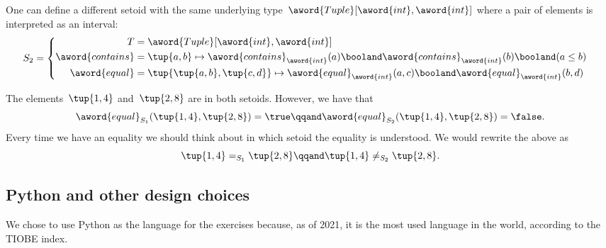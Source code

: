 One can define a different setoid with the same underlying type~$\aword{Tuple}[\aword{int}, \aword{int}]$ where a pair of elements is interpreted as an interval:
\begin{equation}
    S_2 =
    \begin{cases}
        \begin{aligned}
            T                & = \aword{Tuple}[\aword{int}, \aword{int}] \\
            \aword{contains} & = \tup{a,b} \mapsto
            \aword{contains}_{\aword{int}}(a)
            \booland
            \aword{contains}_{\aword{int}}(b)
            \booland
            (a\leq b) \\
            \aword{equal}    & = \tup{\tup{a,b}, \tup{c,d}}
            \mapsto
            \aword{equal}_{\aword{int}}(a,c)
            \booland
            \aword{equal}_{\aword{int}}(b,d)
        \end{aligned}
    \end{cases}
\end{equation}

The elements~$\tup{1,4}$ and~$\tup{2, 8}$ are in both setoids.
However, we have that
\begin{equation}
    \aword{equal}_{S_1} (\tup{1,4}, \tup{2, 8}) = \true
    \qqand
    \aword{equal}_{S_2} (\tup{1,4}, \tup{2, 8}) = \false .
\end{equation}
Every time we have an equality we should think about in which setoid the equality is understood.
We would rewrite the above as
\begin{equation}
    \tup{1,4} =_{S_1} \tup{2, 8}
    \qqand
    \tup{1,4} \neq_{S_2} \tup{2, 8}.
\end{equation}

\subsection{Python and other design choices}

We chose to use Python as the language for the exercises because, as of 2021, it is the most used language in the world, according to the TIOBE index.

